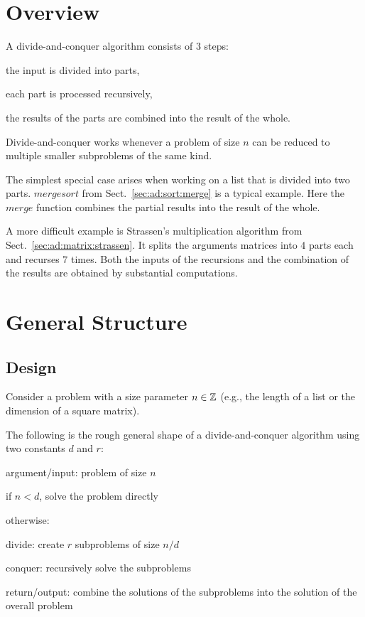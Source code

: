 \section{Overview}

A divide-and-conquer algorithm consists of $3$ steps:
\begin{compactenum}
 \item the input is divided into parts,
 \item each part is processed recursively,
 \item the results of the parts are combined into the result of the whole.
\end{compactenum}
Divide-and-conquer works whenever a problem of size $n$ can be reduced to multiple smaller subproblems of the same kind.

The simplest special case arises when working on a list that is divided into two parts.
$mergesort$ from Sect.~\ref{sec:ad:sort:merge} is a typical example.
Here the $merge$ function combines the partial results into the result of the whole.

A more difficult example is Strassen's multiplication algorithm from Sect.~\ref{sec:ad:matrix:strassen}.
It splits the arguments matrices into $4$ parts each and recurses $7$ times.
Both the inputs of the recursions and the combination of the results are obtained by substantial computations.

\section{General Structure}

\subsection{Design}

Consider a problem with a size parameter $n\in \mathbb{Z}$ (e.g., the length of a list or the dimension of a square matrix).

The following is the rough general shape of a divide-and-conquer algorithm using two constants $d$ and $r$:
\begin{compactenum}
 \item argument/input: problem of size $n$
 \item if $n<d$, solve the problem directly
 \item otherwise:
 \begin{compactenum}
  \item divide: create $r$ subproblems of size $n/d$
  \item conquer: recursively solve the subproblems
  \item return/output: combine the solutions of the subproblems into the solution of the overall problem
 \end{compactenum}
\end{compactenum}

